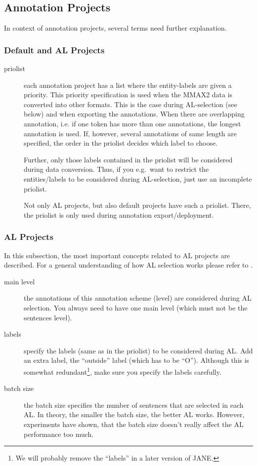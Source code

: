 \documentclass[DIV12,english,11pt,halfparskip]{scrartcl}
\begin{document}
\begin{appendix}
\subsection{Annotation Projects}

In context of annotation projects, several terms need further
explanation.

\subsubsection{Default and AL Projects}

\begin{description}
\item[priolist] each annotation project has a list where the
  entity-labels are given a priority. This priority specification is
  used when the MMAX2 data is converted into other formats. This is
  the case during AL-selection (see below) and when exporting the
  annotations. When there are overlapping annotation, i.e. if one
  token has more than one annotations, the longest annotation is used.
  If, however, several annotations of same length are specified, the
  order in the priolist decides which label to choose.

  Further, only those labels contained in the priolist will be
  considered during data conversion. Thus, if you e.g.\ want to
  restrict the entities/labels to be considered during AL-selection,
  just use an incomplete priolist.

  Not only AL projects, but also default projects have such a
  priolist. There, the priolist is only used during annotation
  export/deployment.
\end{description}




\subsubsection{AL Projects}

In this subsection, the most important concepts related to AL projects
are described. For a general understanding of how AL selection works
please refer to \cite{Tomanek2007emnlp, Tomanek2007law}.

\begin{description}
\item[main level] the annotations of this annotation scheme (level)
  are considered during AL selection. You always need to have one main
  level (which must not be the sentences level).
\item[labels] specify the labels (same as in the priolist) to be
  considered during AL. Add an extra label, the ``outside'' label
  (which has to be ``O''). Although this is somewhat
  redundant\footnote{We will probably remove the ``labels'' in a later
    version of JANE.}, make sure you specify the labels carefully.
\item[batch size] the batch size specifies the number of sentences
  that are selected in each AL. In theory, the smaller the batch size,
  the better AL works. However, experiments have shown, that the batch
  size doesn't really affect the AL performance too much. 


\end{description}
\end{appendix}
\end{document}
